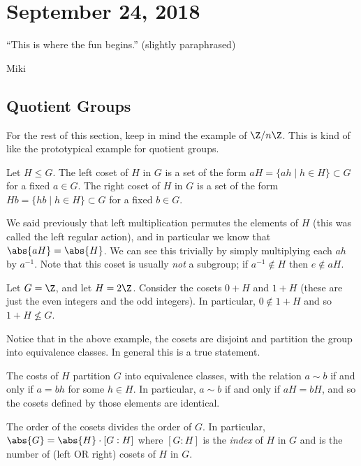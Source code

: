 \section{September 24, 2018}

\epigraph{``This is where the fun begins.'' (slightly paraphrased)}{Miki}

\subsection{Quotient Groups}

For the rest of this section, keep in mind the example of $\Z/n\Z$. This is kind of like the prototypical example for quotient groups.

\begin{definition}[Coset]
Let $H \leq G$. The left coset of $H$ in $G$ is a set of the form $aH = \{ah \mid h \in H\} \subset G$ for a fixed $a \in G$. The right coset of $H$ in $G$ is a set of the form $Hb = \{hb \mid h \in H\} \subset G$ for a fixed $b \in G$.
\end{definition}

We said previously that left multiplication permutes the elements of $H$ (this was called the left regular action), and in particular we know that $\abs{aH} = \abs{H}$. We can see this trivially by simply multiplying each $ah$ by $a^{-1}$. Note that this coset is usually \emph{not} a subgroup; if $a^{-1} \notin H$ then $e \notin aH$.

\begin{example}
Let $G = \Z$, and let $H = 2\Z$. Consider the cosets $0 + H$ and $1 + H$ (these are just the even integers and the odd integers). In particular, $0 \notin 1 + H$ and so $1 + H \not\leq G$.
\end{example}

Notice that in the above example, the cosets are disjoint and partition the group into equivalence classes. In general this is a true statement.

\begin{lemma}
The costs of $H$ partition $G$ into equivalence classes, with the relation $a \sim b$ if and only if $a = bh$ for some $h \in H$. In particular, $a \sim b$ if and only if $aH = bH$, and so the cosets defined by those elements are identical.
\end{lemma}

\begin{corollary}
The order of the cosets divides the order of $G$. In particular, $\abs{G} = \abs{H} \cdot [G : H]$ where $[G : H]$ is the \emph{index} of $H$ in $G$ and is the number of (left OR right) cosets of $H$ in $G$.
\end{corollary}

